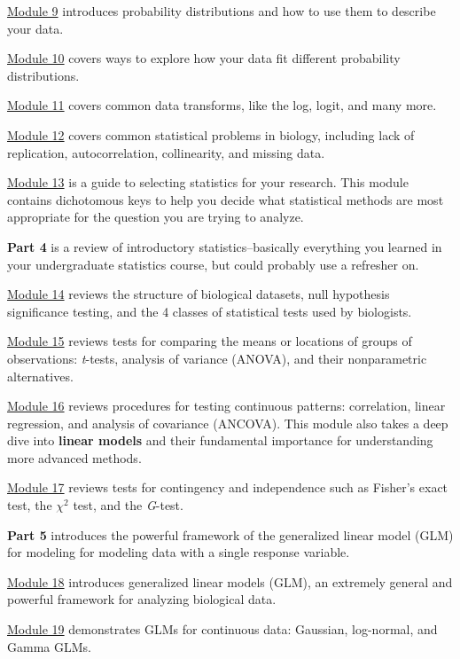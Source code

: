 \documentclass[
  13,
  letterpaper,
]{report}
\begin{document}
\hyperref[sec-dist]{Module 9} introduces probability distributions and
how to use them to describe your data.

\hyperref[sec-dtest]{Module 10} covers ways to explore how your data fit
different probability distributions.

\hyperref[sec-trans]{Module 11} covers common data transforms, like the
log, logit, and many more.

\hyperref[sec-problem]{Module 12} covers common statistical problems in
biology, including lack of replication, autocorrelation, collinearity,
and missing data.

\hyperref[sec-plan]{Module 13} is a guide to selecting statistics for
your research. This module contains dichotomous keys to help you decide
what statistical methods are most appropriate for the question you are
trying to analyze.

\textbf{Part 4} is a review of introductory statistics--basically
everything you learned in your undergraduate statistics course, but
could probably use a refresher on.

\hyperref[sec-review]{Module 14} reviews the structure of biological
datasets, null hypothesis significance testing, and the 4 classes of
statistical tests used by biologists.

\hyperref[sec-groups]{Module 15} reviews tests for comparing the means
or locations of groups of observations: \emph{t}-tests, analysis of
variance (ANOVA), and their nonparametric alternatives.

\hyperref[sec-contin]{Module 16} reviews procedures for testing
continuous patterns: correlation, linear regression, and analysis of
covariance (ANCOVA). This module also takes a deep dive into
\textbf{linear models} and their fundamental importance for
understanding more advanced methods.

\hyperref[sec-indep]{Module 17} reviews tests for contingency and
independence such as Fisher's exact test, the \(\chi^2\) test, and the
\emph{G}-test.

\textbf{Part 5} introduces the powerful framework of the generalized
linear model (GLM) for modeling for modeling data with a single response
variable.

\hyperref[sec-glm1]{Module 18} introduces generalized linear models
(GLM), an extremely general and powerful framework for analyzing
biological data.

\hyperref[sec-glm2]{Module 19} demonstrates GLMs for continuous data:
Gaussian, log-normal, and Gamma GLMs.
\end{document}
